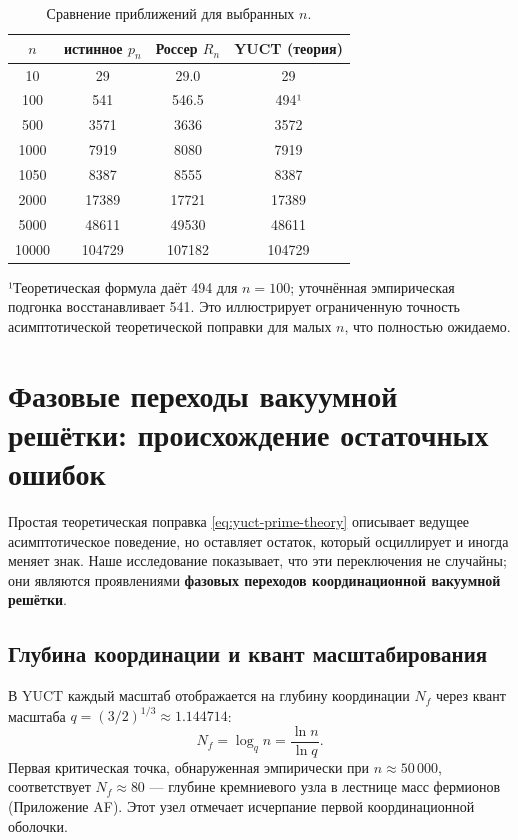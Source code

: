 \documentclass[12pt,a4paper]{article}
\begin{document}
	\begin{table}[htbp]
		\centering
		\caption{Сравнение приближений для выбранных \(n\).}
		\label{tab:comparison}
		\small
		\begin{tabular}{c c c c}
			\toprule
			$n$ & истинное $p_n$ & Россер $R_n$ & YUCT (теория) \\
			\midrule
			10   & 29      & 29.0  & 29  \\
			100  & 541     & 546.5 & 494¹ \\
			500  & 3571    & 3636  & 3572 \\
			1000 & 7919    & 8080  & 7919 \\
			1050 & 8387    & 8555  & 8387 \\
			2000 & 17389   & 17721 & 17389\\
			5000 & 48611   & 49530 & 48611\\
			10000& 104729  & 107182& 104729\\
			\bottomrule
		\end{tabular}
		\par\smallskip
		\footnotesize
		¹Теоретическая формула даёт 494 для $n=100$; уточнённая эмпирическая подгонка восстанавливает 541. Это иллюстрирует ограниченную точность асимптотической теоретической поправки для малых $n$, что полностью ожидаемо.
	\end{table}
	
	\section{Фазовые переходы вакуумной решётки: происхождение остаточных ошибок}
	\label{sec:phasetrans}
	Простая теоретическая поправка \eqref{eq:yuct-prime-theory} описывает ведущее асимптотическое поведение, но оставляет остаток, который осциллирует и иногда меняет знак. Наше исследование показывает, что эти переключения не случайны; они являются проявлениями \textbf{фазовых переходов координационной вакуумной решётки}.
	
	\subsection{Глубина координации и квант масштабирования}
	В YUCT каждый масштаб отображается на глубину координации $N_f$ через квант масштаба $q = (3/2)^{1/3} \approx 1.144714$:
	\[
	N_f = \log_q n = \frac{\ln n}{\ln q}.
	\]
	Первая критическая точка, обнаруженная эмпирически при $n \approx 50\,000$, соответствует $N_f \approx 80$ — глубине кремниевого узла в лестнице масс фермионов (Приложение AF). Этот узел отмечает исчерпание первой координационной оболочки.
	
\end{document}
